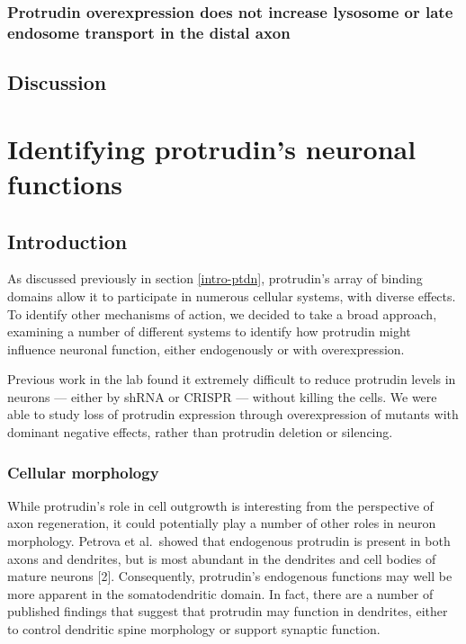 \documentclass[
  12pt,
  a4paper,
]{book}
\renewcommand{\chaptermark}[1]{\markboth{#1}{}}
\begin{document}
\hypertarget{lyso-LE}{%
\subsection{Protrudin overexpression does not increase lysosome or late endosome transport in the distal axon}\label{lyso-LE}}

\hypertarget{no-FYCO}{%
\section{Discussion}\label{no-FYCO}}

\hypertarget{identifying-protrudins-neuronal-functions}{%
\chapter{Identifying protrudin's neuronal functions}\label{identifying-protrudins-neuronal-functions}}

\chaptermark{Neuronal functions}

\hypertarget{introduction-1}{%
\section{Introduction}\label{introduction-1}}

As discussed previously in section \ref{intro-ptdn}, protrudin's array of binding domains allow it to participate in numerous cellular systems, with diverse effects. To identify other mechanisms of action, we decided to take a broad approach, examining a number of different systems to identify how protrudin might influence neuronal function, either endogenously or with overexpression.

Previous work in the lab found it extremely difficult to reduce protrudin levels in neurons --- either by shRNA or CRISPR --- without killing the cells. We were able to study loss of protrudin expression through overexpression of mutants with dominant negative effects, rather than protrudin deletion or silencing.

\hypertarget{cellular-morphology}{%
\subsection{Cellular morphology}\label{cellular-morphology}}

While protrudin's role in cell outgrowth is interesting from the perspective of axon regeneration, it could potentially play a number of other roles in neuron morphology. Petrova et al.~showed that endogenous protrudin is present in both axons and dendrites, but is most abundant in the dendrites and cell bodies of mature neurons {[}2{]}. Consequently, protrudin's endogenous functions may well be more apparent in the somatodendritic domain. In fact, there are a number of published findings that suggest that protrudin may function in dendrites, either to control dendritic spine morphology or support synaptic function.
\end{document}

